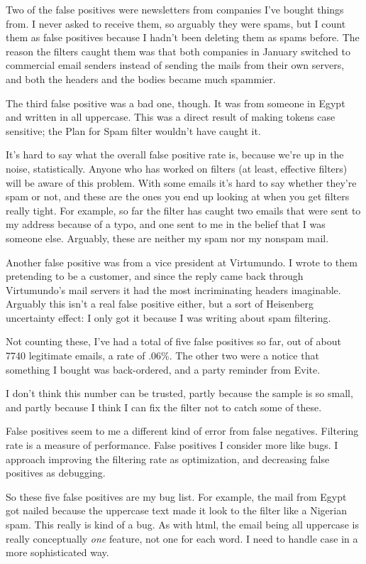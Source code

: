 Two of the false positives were newsletters from companies I've bought
things from. I never asked to receive them, so arguably they were spams,
but I count them as false positives because I hadn't been deleting them
as spams before. The reason the filters caught them was that both
companies in January switched to commercial email senders instead of
sending the mails from their own servers, and both the headers and the
bodies became much spammier.

The third false positive was a bad one, though. It was from someone in
Egypt and written in all uppercase. This was a direct result of making
tokens case sensitive; the Plan for Spam filter wouldn't have caught it.

It's hard to say what the overall false positive rate is, because we're
up in the noise, statistically. Anyone who has worked on filters (at
least, effective filters) will be aware of this problem. With some
emails it's hard to say whether they're spam or not, and these are the
ones you end up looking at when you get filters really tight. For
example, so far the filter has caught two emails that were sent to my
address because of a typo, and one sent to me in the belief that I was
someone else. Arguably, these are neither my spam nor my nonspam mail.

Another false positive was from a vice president at Virtumundo. I wrote
to them pretending to be a customer, and since the reply came back
through Virtumundo's mail servers it had the most incriminating headers
imaginable. Arguably this isn't a real false positive either, but a sort
of Heisenberg uncertainty effect: I only got it because I was writing
about spam filtering.

Not counting these, I've had a total of five false positives so far, out
of about 7740 legitimate emails, a rate of .06\%. The other two were a
notice that something I bought was back-ordered, and a party reminder
from Evite.

I don't think this number can be trusted, partly because the sample is
so small, and partly because I think I can fix the filter not to catch
some of these.

False positives seem to me a different kind of error from false
negatives. Filtering rate is a measure of performance. False positives I
consider more like bugs. I approach improving the filtering rate as
optimization, and decreasing false positives as debugging.

So these five false positives are my bug list. For example, the mail
from Egypt got nailed because the uppercase text made it look to the
filter like a Nigerian spam. This really is kind of a bug. As with html,
the email being all uppercase is really conceptually \emph{one} feature,
not one for each word. I need to handle case in a more sophisticated
way.

